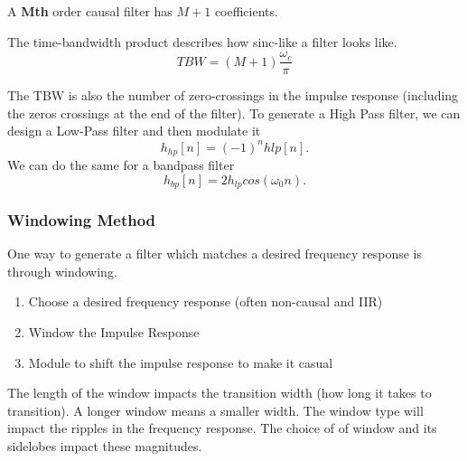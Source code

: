 A \textbf{Mth} order causal filter has $M+1$ coefficients. 
\begin{definition}
  The time-bandwidth product describes how sinc-like a filter looks like.
  \[
	TBW = (M+1)\frac{\omega_c}{\pi}
  \]
  \label{defn:tbw}
\end{definition}
The TBW is also the number of zero-crossings in the impulse response (including the zeros crossings at the end of the filter).
To generate a High Pass filter, we can design a Low-Pass filter and then modulate it
\[
  h_{hp}[n] = (-1)^nh{lp}[n].
\]
We can do the same for a bandpass filter
\[
  h_{bp}[n] = 2h_{lp}cos(\omega_0 n).
\]
\subsubsection{Windowing Method}
One way to generate a filter which matches a desired frequency response is through windowing.
\begin{enumerate}[1.]
  \item Choose a desired frequency response (often non-causal and IIR)
  \item Window the Impulse Response
  \item Module to shift the impulse response to make it casual
\end{enumerate}
The length of the window impacts the transition width (how long it takes to transition). A longer window means a smaller width. The window type will impact
the ripples in the frequency response. The choice of of window and its sidelobes impact these magnitudes.
